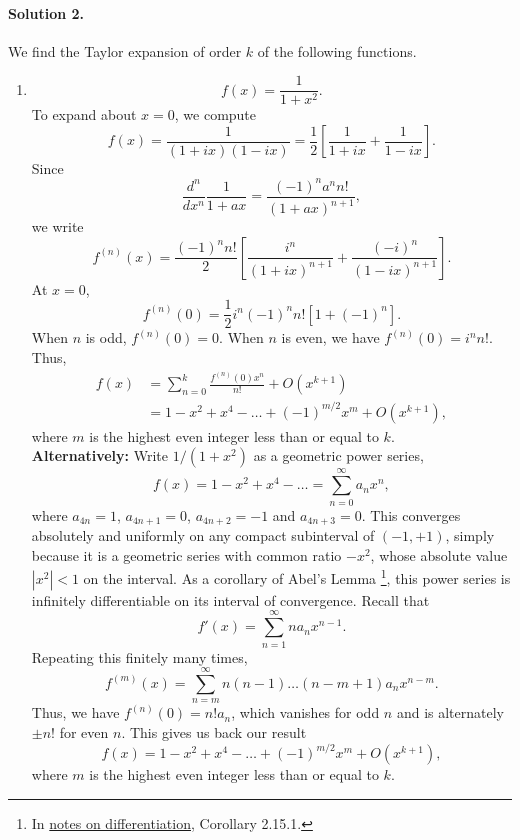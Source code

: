 \documentclass[10pt]{article}
\newcommand\ddx[1]{\frac{d^{#1}}{dx^{#1}}}
\begin{document}
    \paragraph{Solution 2.}
    We find the Taylor expansion of order $k$ of the following functions. 
    \begin{enumerate}
        \item \[
            f(x) = \frac{1}{1 + x^2}.
        \] To expand about $x = 0$, we compute \[
            f(x) = \frac{1}{(1 + ix)(1 - ix)} 
                = \frac{1}{2}\left[\frac{1}{1 + ix} + \frac{1}{1 - ix}\right].
        \] Since \[
            \ddx{n}\frac{1}{1 + ax} = \frac{(-1)^na^n n!}{(1 + ax)^{n + 1}},
        \] we write \[
            f^{(n)}(x) = \frac{(-1)^nn!}{2}\left[\frac{i^n}{(1 + ix)^{n + 1}} +
            \frac{(-i)^n}{(1 - ix)^{n + 1}}\right].
        \] At $x = 0$, \[
            f^{(n)}(0) = \frac{1}{2}i^n(-1)^nn!\left[1 + (-1)^n\right].
        \] When $n$ is odd, $f^{(n)}(0) = 0$. When $n$ is even, we have $f^{(n)}(0)
        = i^nn!$. Thus, \begin{align*}
            f(x) &= \sum_{n = 0}^k \frac{f^{(n)}(0)x^n}{n!} + O(x^{k + 1}) \\
            &= 1 - x^2 + x^4 - \dots + (-1)^{m / 2}x^m + O(x^{k + 1}),
        \end{align*}
        where $m$ is the highest even integer less than or equal to $k$. \\

        \noindent \textbf{Alternatively:} Write $1 / (1 + x^2)$ as a geometric power
        series, \[
            f(x) = 1 - x^2 + x^4 - \dots = \sum_{n = 0}^\infty a_nx^n,
        \] where $a_{4n} = 1$, $a_{4n + 1} = 0$, $a_{4n + 2} = -1$ and $a_{4n + 3}
        = 0$. This converges absolutely and uniformly on any compact subinterval of
        $(-1, +1)$, simply because it is a geometric series with common ratio
        $-x^2$, whose absolute value $|x^2| < 1$ on the interval.  As a corollary of
        Abel's Lemma \footnote{In
        \href{https://sahasatvik.me/assignments/MA2201/notes_2_diff.pdf}{notes on
        differentiation}, Corollary 2.15.1.}, this power series is infinitely
        differentiable on its interval of convergence. Recall that \[
            f'(x) = \sum_{n = 1}^\infty na_nx^{n - 1}.
        \] Repeating this finitely many times, \[
            f^{(m)}(x) = \sum_{n = m}^\infty n(n - 1)\dots(n - m + 1)a_nx^{n - m}.
        \] Thus, we have $f^{(n)}(0) = n!a_n$, which vanishes for odd $n$ and is
        alternately $\pm n!$ for even $n$. This gives us back our result \[
            f(x) = 1 - x^2 + x^4 - \dots + (-1)^{m / 2}x^m + O(x^{k + 1}),
        \] where $m$ is the highest even integer less than or equal to $k$.


\end{enumerate}
\end{document}
